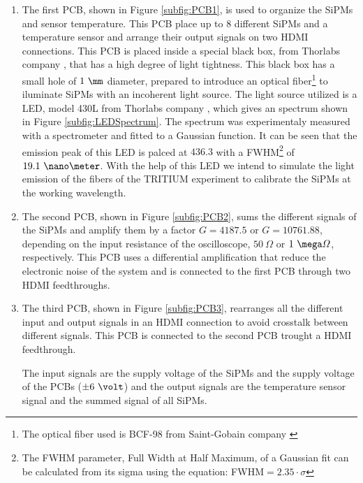 \begin{enumerate}
\item{} The first PCB, shown in Figure \ref{subfig:PCB1}, is used to organize the SiPMs and sensor temperature. This PCB place up to 8 different SiPMs and a temperature sensor and arrange their output signals on two HDMI connections. This PCB is placed inside a special black box, from Thorlabs company \cite{ThorlabsCompany}, that has a high degree of light tightness. This black box has a small hole of $1~\mm$ diameter, prepared to introduce an optical fiber\footnote{The optical fiber used is BCF-98 from Saint-Gobain company \cite{OpticalFibers}} to iluminate SiPMs with an incoherent light source. The light source utilized is a LED, model 430L from Thorlabs company \cite{LEDThorlabs}, which gives an spectrum shown in Figure \ref{subfig:LEDSpectrum}. The spectrum was experimentaly measured with a spectrometer and fitted to a Gaussian function. It can be seen that the emission peak of this LED is palced at $436.3$ with a FWHM\footnote{The FWHM parameter, Full Width at Half Maximum, of a Gaussian fit can be calculated from its sigma using the equation: FWHM$=2.35 \cdot{} \sigma$} of $19.1~\nano\meter$. With the help of this LED we intend to simulate the light emission of the fibers of the TRITIUM experiment to calibrate the SiPMs at the working wavelength. 

\item{} The second PCB, shown in Figure \ref{subfig:PCB2}, sums the different signals of the SiPMs and amplify them by a factor $G=4187.5$ or $G=10761.88$, depending on the input resistance of the oscilloscope, $50~\varOmega$ or $1~\mega\varOmega$, respectively. This PCB uses a differential amplification that reduce the electronic noise of the system and is connected to the first PCB through two HDMI feedthroughs.

\item{} The third PCB, shown in Figure \ref{subfig:PCB3}, rearranges all the different input and output signals in an HDMI connection to avoid crosstalk between different signals. This PCB is connected to the second PCB trought a HDMI feedthrough.

The input signals are the supply voltage of the SiPMs and the supply voltage of the PCBs ($\pm 6~\volt$) and the output signals are the temperature sensor signal and the summed signal of all SiPMs. 

\end{enumerate}


